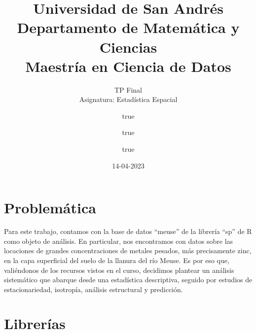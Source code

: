 \documentclass[
  12pt,
]{article}
\title{Universidad de San Andrés\\
Departamento de Matemática y Ciencias\\
Maestría en Ciencia de Datos}
\subtitle{TP Final\\
Asignatura: Estadística Espacial}
\author{true \and true \and true}
\date{14-04-2023}
\begin{document}
\maketitle

{
\setcounter{tocdepth}{2}
\tableofcontents
}
\hypertarget{problemuxe1tica}{%
\section{Problemática}\label{problemuxe1tica}}

Para este trabajo, contamos con la base de datos ``meuse'' de la
librería ``sp'' de R como objeto de análisis. En particular, nos
encontramos con datos sobre las locaciones de grandes concentraciones de
metales pesados, más precisamente zinc, en la capa superficial del suelo
de la llanura del río Meuse. Es por eso que, valiéndonos de los recursos
vistos en el curso, decidimos plantear un análisis sistemático que
abarque desde una estadística descriptiva, seguido por estudios de
estacionariedad, isotropía, análisis estructural y predicción.

\hypertarget{libreruxedas}{%
\section{Librerías}\label{libreruxedas}}
\end{document}
